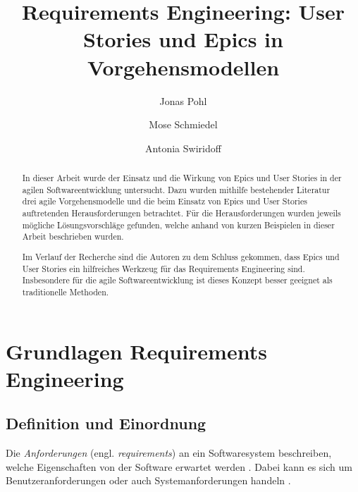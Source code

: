 \documentclass[acmtog]{acmart}
\begin{document}
\hypersetup{
	colorlinks,
	allcolors=blue,
	citecolor=.,
}

\title{Requirements Engineering: User Stories und Epics in Vorgehensmodellen}

\author{Jonas Pohl}
\author{Mose Schmiedel}
\authornotemark[1]
\author{Antonia Swiridoff}
\authornotemark[1]

\renewcommand{\shortauthors}{Pohl, Schmiedel and Swiridoff}


\begin{abstract}
	In dieser Arbeit wurde der Einsatz und die Wirkung von Epics und User Stories in der agilen Softwareentwicklung untersucht.
	Dazu wurden mithilfe bestehender Literatur drei agile Vorgehensmodelle und die beim Einsatz von Epics und User Stories
	auftretenden Herausforderungen betrachtet.
	Für die Herausforderungen wurden jeweils mögliche Lösungsvorschläge gefunden, welche anhand von kurzen Beispielen
	in dieser Arbeit beschrieben wurden.

	Im Verlauf der Recherche sind die Autoren zu dem Schluss gekommen, dass Epics und User Stories ein hilfreiches Werkzeug
	für das Requirements Engineering sind. Insbesondere für die agile Softwareentwicklung ist dieses Konzept besser geeignet als traditionelle
	Methoden.
\end{abstract}

\maketitle

\section{Grundlagen Requirements Engineering}

\subsection{Definition und Einordnung}
Die \emph{Anforderungen} (engl. \textit{requirements}) an ein Softwaresystem beschreiben, welche Eigenschaften von der Software erwartet werden \cite{sommerville16}. Dabei kann es sich um Benutzeranforderungen oder auch Systemanforderungen handeln \cite{sommerville16}.
\end{document}
